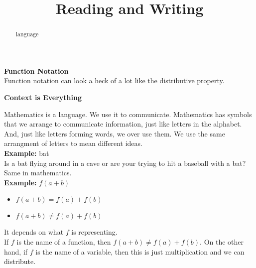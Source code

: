 \documentclass{ximera}
\title{Reading and Writing}
\begin{document}
\begin{abstract}
language
\end{abstract}
\maketitle





\begin{warning} \textbf{\textcolor{red!80!black}{Function Notation}}  \\



Function notation can look a heck of a lot like the distributive property. \\


\begin{center}

\textbf{\textcolor{purple!85!blue}{Context is Everything}}

\end{center}


Mathematics is a language.  We use it to communicate.  Mathematics has symbols that we arrange to communicate information, just like letters in the alphabet. \\

And, just like letters forming words, we over use them.  We use the same arrangment of letters to mean different ideas. \\

\textbf{Example:} bat \\

Is a bat flying around in a cave or are your trying to hit a baseball with a bat? \\


Same in mathematics.\\



\textbf{Example:} $f(a + b)$ \\

\begin{itemize}
	\item $f(a + b) = f(a) + f(b)$
	\item $f(a + b) \ne f(a) + f(b)$
\end{itemize}


It depends on what $f$ is representing. \\

If $f$ is the name of a function, then $f(a + b) \ne f(a) + f(b)$.  On the other hand, if $f$ is the name of a variable, then this is just multiplication and we can distribute.



\end{warning}
\end{document}
